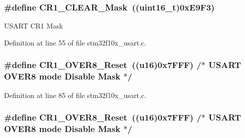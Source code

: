 \subsubsection[{\texorpdfstring{C\+R1\+\_\+\+C\+L\+E\+A\+R\+\_\+\+Mask}{CR1_CLEAR_Mask}}]{\setlength{\rightskip}{0pt plus 5cm}\#define C\+R1\+\_\+\+C\+L\+E\+A\+R\+\_\+\+Mask~(({\bf uint16\+\_\+t})0x\+E9\+F3)}\hypertarget{group___u_s_a_r_t___private___defines_ga67f7dd35ea3d1296677e5fc50b88fa90}{}\label{group___u_s_a_r_t___private___defines_ga67f7dd35ea3d1296677e5fc50b88fa90}
U\+S\+A\+RT C\+R1 Mask 

Definition at line 55 of file stm32f10x\+\_\+usart.\+c.

\subsubsection[{\texorpdfstring{C\+R1\+\_\+\+O\+V\+E\+R8\+\_\+\+Reset}{CR1_OVER8_Reset}}]{\setlength{\rightskip}{0pt plus 5cm}\#define C\+R1\+\_\+\+O\+V\+E\+R8\+\_\+\+Reset~(({\bf u16})0x7\+F\+F\+F)  /$\ast$ U\+S\+A\+R\+T O\+V\+E\+R8 mode Disable Mask $\ast$/}\hypertarget{group___u_s_a_r_t___private___defines_gaf84165f2974000906c495b3c27dc5121}{}\label{group___u_s_a_r_t___private___defines_gaf84165f2974000906c495b3c27dc5121}


Definition at line 85 of file stm32f10x\+\_\+usart.\+c.

\subsubsection[{\texorpdfstring{C\+R1\+\_\+\+O\+V\+E\+R8\+\_\+\+Reset}{CR1_OVER8_Reset}}]{\setlength{\rightskip}{0pt plus 5cm}\#define C\+R1\+\_\+\+O\+V\+E\+R8\+\_\+\+Reset~(({\bf u16})0x7\+F\+F\+F)  /$\ast$ U\+S\+A\+R\+T O\+V\+E\+R8 mode Disable Mask $\ast$/}\hypertarget{group___u_s_a_r_t___private___defines_gaf84165f2974000906c495b3c27dc5121}{}\label{group___u_s_a_r_t___private___defines_gaf84165f2974000906c495b3c27dc5121}


